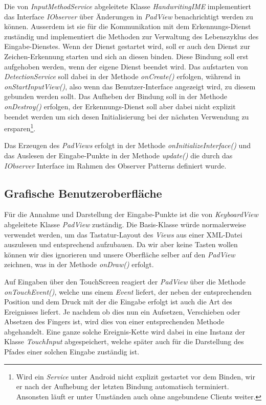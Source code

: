 Die von \emph{InputMethodService} abgeleitete Klasse \emph{HandwritingIME} implementiert das Interface \emph{IObserver} über Änderungen in \emph{PadView} benachrichtigt werden zu können. Ausserdem ist sie für die Kommunikation mit dem Erkennungs-Dienst zuständig und implementiert die Methoden zur Verwaltung des Lebenszyklus des Eingabe-Dienstes. Wenn der Dienst gestartet wird, soll er auch den Dienst zur Zeichen-Erkennung starten und sich an diesen binden. Diese Bindung soll erst aufgehoben werden, wenn der eigene Dienst beendet wird. Das aufstarten von \emph{DetectionService} soll dabei in der Methode \emph{onCreate()}  erfolgen, während in \emph{onStartInputView()}, also wenn das Benutzer-Interface angezeigt wird, zu diesem gebunden werden sollt. Das Aufheben der Bindung soll in der Methode \emph{onDestroy()} erfolgen, der Erkennungs-Dienst soll aber dabei nicht explizit beendet werden um sich desen Initialisierung bei der nächsten Verwendung zu ersparen\footnote{Wird ein \emph{Service} unter Android nicht explizit gestartet vor dem Binden, wir er nach der Aufhebung der letzten Bindung automatisch terminiert. Ansonsten läuft er unter Umständen auch ohne angebundene Clients weiter.}.

Das Erzeugen des \emph{PadViews} erfolgt in der Methode \emph{onInitializeInterface()} und das Auslesen der Eingabe-Punkte in der Methode \emph{update()} die durch das \emph{IObserver} Interface im Rahmen des Observer Patterns definiert wurde.

\subsection{Grafische Benutzeroberfläche}

Für die Annahme und Darstellung der Eingabe-Punkte ist die von \emph{KeyboardView} abgeleitete Klasse \emph{PadView} zuständig. Die Basis-Klasse würde normalerweise verwendet werden, um das Tastatur-Layout des \emph{Views} aus einer XML-Datei auszulesen und entsprechend aufzubauen. Da wir aber keine Tasten wollen können wir dies ignorieren und unsere Oberfläche selber auf den \emph{PadView} zeichnen, was in der Methode \emph{onDraw()} erfolgt.

Auf Eingaben über den TouchScreen reagiert der \emph{PadView} über die Methode \emph{onTouchEvent()}, welche uns einem \emph{Event} liefert, der neben der entsprechenden Position und dem Druck mit der die Eingabe erfolgt ist auch die Art des Ereignisses liefert. Je nachdem ob dies nun ein Aufsetzen, Verschieben oder Absetzen des Fingers ist, wird dies von einer entsprechenden Methode abgehandelt. Eine ganze solche Ereignis-Kette wird dabei in eine Instanz der Klasse \emph{TouchInput} abgespeichert, welche später auch für die Darstellung des Pfades einer solchen Eingabe zuständig ist.

